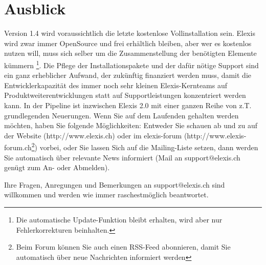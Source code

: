 \documentclass[a4paper]{scrartcl}
\begin{document}
\section{Ausblick}
Version 1.4 wird voraussichtlich die letzte kostenlose Vollinstallation sein. Elexis wird zwar immer OpenSource und frei erhältlich bleiben, aber wer es kostenlos nutzen will, muss sich selber um die Zusammenstellung der benötigten Elemente kümmern \footnote{Die automatische Update-Funktion bleibt erhalten, wird aber nur Fehlerkorrekturen beinhalten.}. Die Pflege der Installationspakete und der dafür nötige Support sind ein ganz erheblicher Aufwand, der zukünftig finanziert werden muss, damit die Entwicklerkapazität des immer noch sehr kleinen Elexis-Kernteams auf Produktweiterentwicklungen statt auf Supportleistungen konzentriert werden kann. In der Pipeline ist inzwischen Elexis 2.0 mit einer ganzen Reihe von z.T. grundlegenden Neuerungen. Wenn Sie auf dem Laufenden gehalten werden möchten, haben Sie folgende Möglichkeiten: Entweder Sie schauen ab und zu auf der Website (http://www.elexis.ch) oder im elexis-forum (http://www.elexis-forum.ch\footnote{Beim Forum können Sie auch einen RSS-Feed abonnieren, damit Sie automatisch über neue Nachrichten informiert werden}) vorbei, oder Sie lassen Sich auf die Mailing-Liste setzen, dann werden Sie automatisch über relevante News informiert (Mail an support$@$elexis.ch genügt zum An- oder Abmelden).

\medskip

Ihre Fragen, Anregungen und Bemerkungen an support$@$elexis.ch sind willkommen und werden wie immer raschestmöglich beantwortet.
\end{document}
